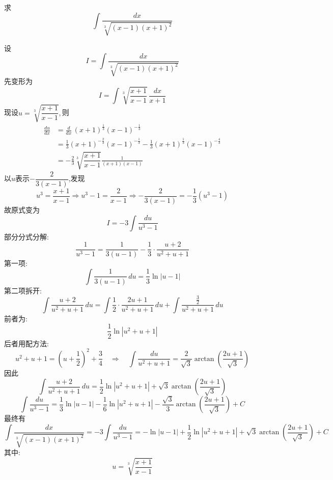 \begin{questions}
    \question 求
    \[
    \int \frac{dx}{\sqrt[3]{(x-1)(x+1)^2}}
    \]
    \begin{solution}
        设
        \[
        I=\int \frac{dx}{\sqrt[3]{(x-1)(x+1)^2}}
        \]
        先变形为
        \[
        I=\int \sqrt[3]{\frac{x+1}{x-1}}\,\frac{dx}{x+1}\]
        现设$u=\sqrt[3]{\dfrac{x+1}{x-1}},$则
        \begin{align*}
        \frac{du}{dx}
        &=\frac{d}{dx}\,(x+1)^\frac13(x-1)^{-\frac13}\\
        &=\frac13(x+1)^{-\frac23}(x-1)^{-\frac13}-\frac13(x+1)^\frac13(x-1)^{-\frac{4}{3}} \\
        &=-\frac23 \sqrt[3]{\dfrac{x+1}{x-1}}\frac{1}{(x+1)(x-1)}
        \end{align*}
        以$u$表示$-\dfrac{2}{3(x-1)}$,发现
        \[
        u^3=\frac{x+1}{x-1} \Rightarrow u^3-1=\frac{2}{x-1} \Rightarrow -\frac{2}{3(x-1)}=-\frac13(u^3-1)
        \]
        故原式变为
        \[
        I=-3\int \frac{du}{u^3-1}
        \]
        部分分式分解:
        \[
        \frac{1}{u^3 - 1} = \frac{1}{3(u - 1)} - \frac{1}{3} \cdot \frac{u + 2}{u^2 + u + 1}
        \]
        第一项:
        \[
        \int \frac{1}{3(u - 1)} \, du = \frac{1}{3} \ln|u - 1|
        \]
        第二项拆开:
        \[
        \int \frac{u + 2}{u^2 + u + 1} \, du = \int \frac{1}{2} \cdot \frac{2u + 1}{u^2 + u + 1} \, du + \int \frac{\frac32}{u^2 + u + 1} \, du
        \]
        前者为:
        \[
        \frac{1}{2} \ln|u^2 + u + 1|
        \]
        后者用配方法:
        \[
        u^2 + u + 1 = \left( u + \frac{1}{2} \right)^2 + \frac{3}{4}
        \quad \Rightarrow \quad
        \int \frac{du}{u^2 + u + 1}
        = \frac{2}{\sqrt{3}} \arctan\left( \frac{2u + 1}{\sqrt{3}} \right)
        \]
        因此
        \[
        \int \frac{u + 2}{u^2 + u + 1} \, du 
        = \frac{1}{2} \ln|u^2 + u + 1| + \sqrt{3} \arctan\left( \frac{2u + 1}{\sqrt{3}} \right)
        \]
        \[
        \int \frac{du}{u^3 - 1} = \frac{1}{3} \ln|u - 1| - \frac{1}{6} \ln|u^2 + u + 1| - \frac{\sqrt{3}}{3} \arctan\left( \frac{2u + 1}{\sqrt{3}} \right) + C
        \]
        最终有
        \[
        \int \frac{dx}{\sqrt[3]{(x - 1)(x + 1)^2}}
        = -3 \int \frac{du}{u^3 - 1}
        = -\ln|u - 1| + \frac{1}{2} \ln|u^2 + u + 1| + \sqrt{3} \arctan\left( \frac{2u + 1}{\sqrt{3}} \right) + C
        \]
        其中:
        \[
        u = \sqrt[3]{\frac{x+1}{x-1}}
        \]
    \end{solution}


\end{questions}
